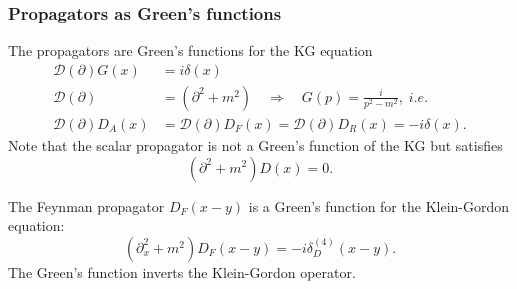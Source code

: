 \subsubsection{Propagators as Green's functions}
\begin{mybox}{}
	The propagators are Green's functions for the KG equation
	\begin{align*}
		\mathcal{D}(\partial) G(x) &= i \delta(x) \\
		\mathcal{D}(\partial) &= (\partial^2 +m^2) \quad \Rightarrow \quad G(p) = \frac{i}{p^2-m^2},\; i.e.\\
		\mathcal{D}(\partial) D_A(x) &= \mathcal{D}(\partial) D_F(x) = \mathcal{D}(\partial) D_R(x) = -i  \delta(x).
	\end{align*}
Note that the scalar propagator is not a Green's function of the KG but satisfies
\begin{equation*}
	(\partial^2 + m^2) D(x) = 0.
\end{equation*}
\end{mybox}
The Feynman propagator $D_F(x-y)$ is a Green's function for the Klein-Gordon equation:
\begin{equation}
	(\partial^2_x + m^2) D_F(x-y) = -i \delta^{(4)}_D(x-y).
\end{equation}
The Green's function inverts the Klein-Gordon operator.
